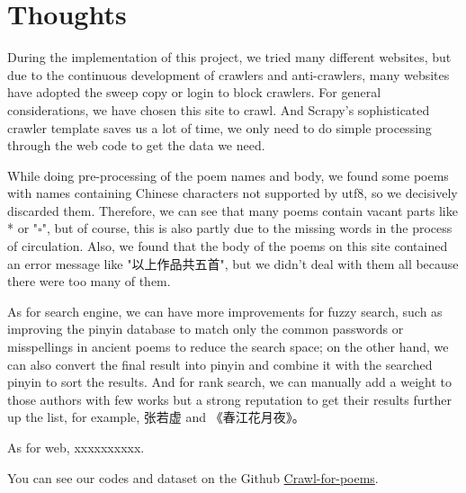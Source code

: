 \section{Thoughts} \label{sec:concl}
During the implementation of this project, we tried many different websites, but due to the continuous development of crawlers and anti-crawlers, many websites have adopted the sweep copy or login to block crawlers. For general considerations, we have chosen this site to crawl. And Scrapy's sophisticated crawler template saves us a lot of time, we only need to do simple processing through the web code to get the data we need. 

While doing pre-processing of the poem names and body, we found some poems with names containing Chinese characters not supported by utf8, so we decisively discarded them. Therefore, we can see that many poems contain vacant parts like * or "$\square$", but of course, this is also partly due to the missing words in the process of circulation. Also, we found that the body of the poems on this site contained an error message like "以上作品共五首", but we didn't deal with them all because there were too many of them.

As for search engine, we can have more improvements for fuzzy search, such as improving the pinyin database to match only the common passwords or misspellings in ancient poems to reduce the search space; on the other hand, we can also convert the final result into pinyin and combine it with the searched pinyin to sort the results. And for rank search, we can manually add a weight to those authors with few works but a strong reputation to get their results further up the list, for example, 张若虚 and 《春江花月夜》。


As for web, xxxxxxxxxx.

You can see our codes and dataset on the Github \href{https://github.com/yashen32768/Crawl-for-poems}{Crawl-for-poems}.